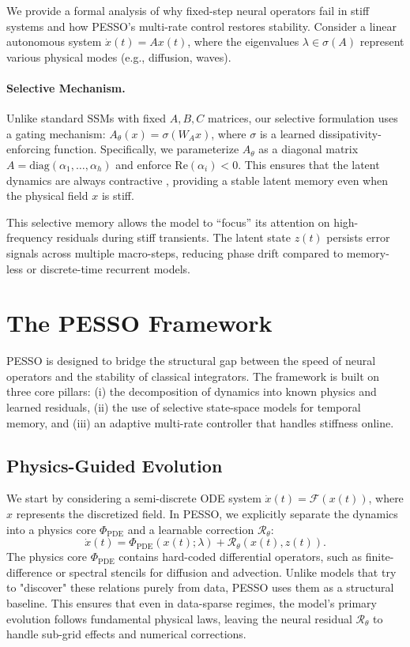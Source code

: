 \documentclass{article}
\theoremstyle{plain}
\theoremstyle{definition}
\theoremstyle{remark}
\begin{document}
We provide a formal analysis of why fixed-step neural operators fail in stiff systems and how PESSO's multi-rate control restores stability. Consider a linear autonomous system $\dot{x}(t) = Ax(t)$, where the eigenvalues $\lambda \in \sigma(A)$ represent various physical modes (e.g., diffusion, waves).

\paragraph{Selective Mechanism.}
Unlike standard SSMs with fixed $A, B, C$ matrices, our selective formulation uses a gating mechanism: $A_\theta(x) = \sigma(W_A x)$, where $\sigma$ is a learned dissipativity-enforcing function. Specifically, we parameterize $A_\theta$ as a diagonal matrix $A = \text{diag}(\alpha_1, \dots, \alpha_h)$ and enforce $\text{Re}(\alpha_i) < 0$. This ensures that the latent dynamics are always contractive \cite{gu2021hippo}, providing a stable latent memory even when the physical field $x$ is stiff.

This selective memory allows the model to ``focus'' its attention on high-frequency residuals during stiff transients. The latent state $z(t)$ persists error signals across multiple macro-steps, reducing phase drift compared to memory-less or discrete-time recurrent models.

\section{The PESSO Framework}
\label{sec:pesso}

PESSO is designed to bridge the structural gap between the speed of neural operators and the stability of classical integrators. The framework is built on three core pillars: (i) the decomposition of dynamics into known physics and learned residuals, (ii) the use of selective state-space models for temporal memory, and (iii) an adaptive multi-rate controller that handles stiffness online.

\subsection{Physics-Guided Evolution}

We start by considering a semi-discrete ODE system $\dot{x}(t) = \mathcal{F}(x(t))$, where $x$ represents the discretized field. In PESSO, we explicitly separate the dynamics into a physics core $\Phi_{\text{PDE}}$ and a learnable correction $\mathcal{R}_\theta$:
\begin{equation}
  \dot{x}(t) = \Phi_{\text{PDE}}(x(t); \lambda) + \mathcal{R}_\theta(x(t), z(t)).
\end{equation}
The physics core $\Phi_{\text{PDE}}$ contains hard-coded differential operators, such as finite-difference or spectral stencils for diffusion and advection. Unlike models that try to "discover" these relations purely from data, PESSO uses them as a structural baseline. This ensures that even in data-sparse regimes, the model’s primary evolution follows fundamental physical laws, leaving the neural residual $\mathcal{R}_\theta$ to handle sub-grid effects and numerical corrections.
\end{document}
